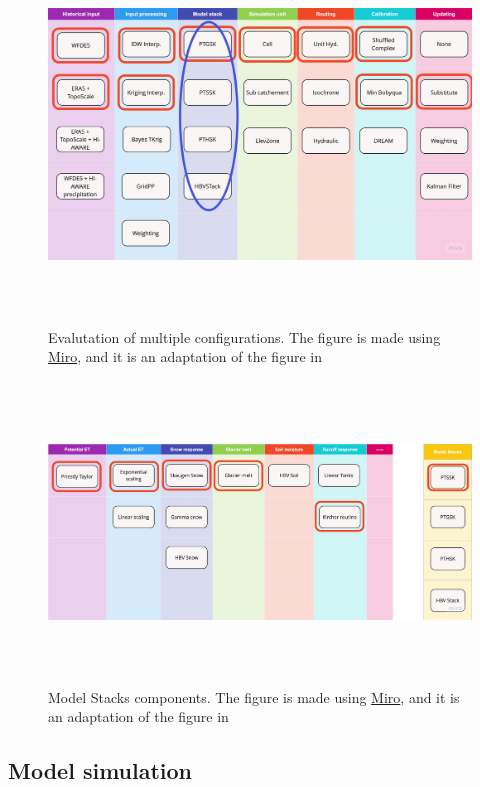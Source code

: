 \begin{figure}[ht]
    \centering
    \includegraphics[width=1.1\textwidth,height=10cm]{figures/methods/configs-4.jpg}
    \caption{Evalutation of multiple configurations. The figure is made using \href{https://miro.com}{Miro}, and it is an adaptation of the figure in \cite{burkhart_shyft_2021}}
    \label{fig:configurations}
\end{figure}

\begin{figure}[ht]
    \centering
    \includegraphics[width=1.1\textwidth,height=8cm]{figures/methods/configs.jpg}
    \caption{Model Stacks components. The figure is made using \href{https://miro.com}{Miro}, and it is an adaptation of the figure in \cite{burkhart_shyft_2021}}
    \label{fig:model_stack}
\end{figure}


\subsection{Model simulation}



